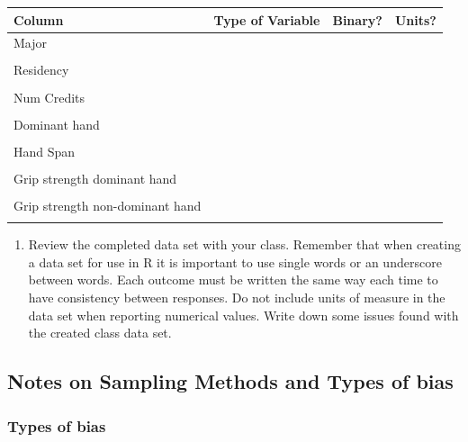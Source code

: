 \documentclass[
]{report}
\providecommand{\tightlist}{%
  \setlength{\itemsep}{0pt}\setlength{\parskip}{0pt}}
\begin{document}
\begin{center}
\begin{tabular}{|l|p{1.5in}|p{0.5in}|p{0.5in}|} \hline
Column & Type of Variable & Binary? & Units? \\ \hline
Major & & &\\
& & & \\ \hline
Residency & & & \\
& & & \\ \hline
Num Credits & & & \\
& & & \\ \hline
Dominant hand & & & \\
& & & \\ \hline
Hand Span & & & \\
& & & \\ \hline
Grip strength dominant hand & & & \\
& & & \\ \hline
Grip strength non-dominant hand & & & \\
& & & \\ \hline
\end{tabular}
\end{center}

\begin{enumerate}
\def\labelenumi{\arabic{enumi}.}
\setcounter{enumi}{3}
\tightlist
\item
  Review the completed data set with your class. Remember that when creating a data set for use in R it is important to use single words or an underscore between words. Each outcome must be written the same way each time to have consistency between responses. Do not include units of measure in the data set when reporting numerical values. Write down some issues found with the created class data set.
\end{enumerate}

\vspace{2.5in}

\subsection*{Notes on Sampling Methods and Types of bias}\label{notes-on-sampling-methods-and-types-of-bias}

\vspace{5in}

\newpage

\subsubsection*{Types of bias}\label{types-of-bias}
\end{document}
